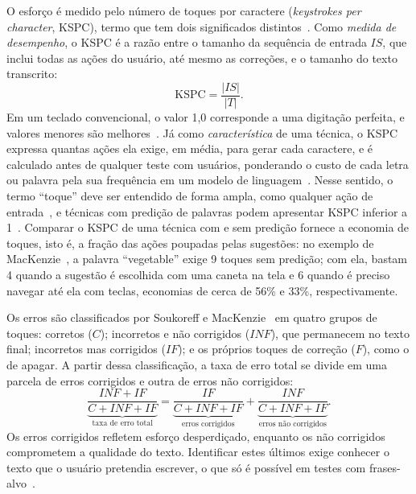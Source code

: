 O esforço é medido pelo número de toques por caractere (\textit{keystrokes per character}, KSPC), termo que tem dois significados distintos~\cite{wobbrock2007measures}. Como \textit{medida de desempenho}, o KSPC é a razão entre o tamanho da sequência de entrada $IS$, que inclui todas as ações do usuário, até mesmo as correções, e o tamanho do texto transcrito:
\begin{equation}
    \mathrm{KSPC} = \frac{|IS|}{|T|}.
    \label{eq:kspc}
\end{equation}
Em um teclado convencional, o valor 1,0 corresponde a uma digitação perfeita, e valores menores são melhores~\cite{wobbrock2007measures}. Já como \textit{característica} de uma técnica, o KSPC expressa quantas ações ela exige, em média, para gerar cada caractere, e é calculado antes de qualquer teste com usuários, ponderando o custo de cada letra ou palavra pela sua frequência em um modelo de linguagem~\cite{mackenzie2002kspc}. Nesse sentido, o termo ``toque'' deve ser entendido de forma ampla, como qualquer ação de entrada~\cite{wobbrock2007measures}, e técnicas com predição de palavras podem apresentar KSPC inferior a 1~\cite{mackenzie2002kspc}. Comparar o KSPC de uma técnica com e sem predição fornece a economia de toques, isto é, a fração das ações poupadas pelas sugestões: no exemplo de MacKenzie~\cite{mackenzie2002kspc}, a palavra ``vegetable'' exige 9 toques sem predição; com ela, bastam 4 quando a sugestão é escolhida com uma caneta na tela e 6 quando é preciso navegar até ela com teclas, economias de cerca de 56\% e 33\%, respectivamente.

Os erros são classificados por Soukoreff e MacKenzie~\cite{soukoreff2003metrics} em quatro grupos de toques: corretos ($C$); incorretos e não corrigidos ($INF$), que permanecem no texto final; incorretos mas corrigidos ($IF$); e os próprios toques de correção ($F$), como o de apagar. A partir dessa classificação, a taxa de erro total se divide em uma parcela de erros corrigidos e outra de erros não corrigidos:
\begin{equation}
    \underbrace{\frac{INF + IF}{C + INF + IF}}_{\text{taxa de erro total}} = \underbrace{\frac{IF}{C + INF + IF}}_{\text{erros corrigidos}} + \underbrace{\frac{INF}{C + INF + IF}}_{\text{erros não corrigidos}}.
    \label{eq:taxas_erro}
\end{equation}
Os erros corrigidos refletem esforço desperdiçado, enquanto os não corrigidos comprometem a qualidade do texto. Identificar estes últimos exige conhecer o texto que o usuário pretendia escrever, o que só é possível em testes com frases-alvo~\cite{soukoreff2003metrics}.

